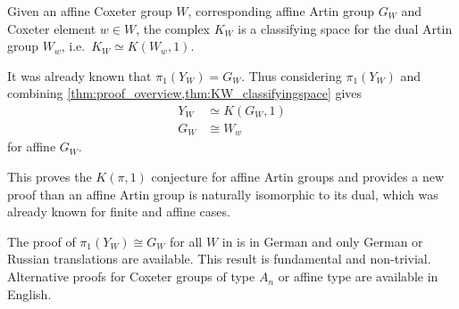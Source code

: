 \documentclass[class=guthesis, crop=false]{standalone}
\begin{document}
\begin{theorem}
	Given an affine Coxeter group $W$, corresponding affine Artin group $G_W$ and Coxeter element $w\in W$, the complex $K_W$ is a classifying space for the dual Artin group $W_w$, i.e.~$K_W \simeq K(W_w, 1)$.
	\label{thm:KW_classifyingspace}
\end{theorem}

It was already known \cite{brieskorn_fundamentalgruppe_1971} that $\pi_1(Y_W) = G_W$. Thus considering $\pi_1(Y_W)$ and combining \cref{thm:proof_overview,thm:KW_classifyingspace} gives
\begin{align*}
	Y_W &\simeq K(G_W,1)\\
	G_W &\cong W_w
	\label{eq:artin_iso_dual}
\end{align*}
for affine $G_W$.

This proves the $K(\pi, 1)$ conjecture for affine Artin groups and provides a new proof than an affine Artin group is naturally isomorphic to its dual, which was already known for finite \cite{bessis_dual_2003} and affine \cite{mccammond_sulway_artin_2017} cases.

The proof of $\pi_1(Y_W) \cong G_W$ for all $W$ in \cite{brieskorn_fundamentalgruppe_1971} is in German and only German or Russian translations are available. This result is fundamental and non-trivial. Alternative proofs for Coxeter groups of type $A_n$ \cite{fox_neuwirth_braid_1962} or affine type \cite{vietdung_fundamental_1983} are available in English.
\end{document}
